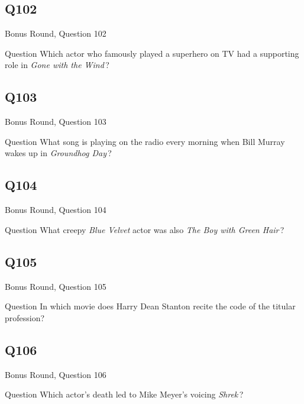 \documentclass[11pt]{beamer}
\begin{document}
\subsection*{Q102}
\begin{frame}[t]{Bonus Round, Question 102}
\vspace{2em}
\begin{block}{Question}
Which actor who famously played a superhero on TV had a supporting role in \emph{Gone with the Wind}\,?
\end{block}
\end{frame}
    

\subsection*{Q103}
\begin{frame}[t]{Bonus Round, Question 103}
\vspace{2em}
\begin{block}{Question}
What song is playing on the radio every morning when Bill Murray wakes up in \emph{Groundhog Day}\,?
\end{block}
\end{frame}
    

\subsection*{Q104}
\begin{frame}[t]{Bonus Round, Question 104}
\vspace{2em}
\begin{block}{Question}
What creepy \emph{Blue Velvet} actor was also \emph{The Boy with Green Hair}\,?
\end{block}
\end{frame}
    

\subsection*{Q105}
\begin{frame}[t]{Bonus Round, Question 105}
\vspace{2em}
\begin{block}{Question}
In which movie does Harry Dean Stanton recite the code of the titular profession?
\end{block}
\end{frame}
    

\subsection*{Q106}
\begin{frame}[t]{Bonus Round, Question 106}
\vspace{2em}
\begin{block}{Question}
Which actor's death led to Mike Meyer's voicing \emph{Shrek}\,?
\end{block}
\end{frame}
    
\end{document}
